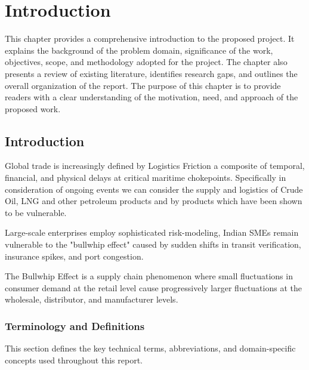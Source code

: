 \chapter{Introduction}
This chapter provides a comprehensive introduction to the proposed project. It explains the
background of the problem domain, significance of the work, objectives, scope, and
methodology adopted for the project. The chapter also presents a review of existing literature,
identifies research gaps, and outlines the overall organization of the report. The purpose of
this chapter is to provide readers with a clear understanding of the motivation, need, and
approach of the proposed work.

\section[Introduction]{\textbf{Introduction}}
Global trade is increasingly defined by Logistics Friction a composite of temporal, financial, and physical delays at critical maritime chokepoints. Specifically in consideration of ongoing events we can consider the supply and logistics of Crude Oil, LNG and other petroleum products and by products which have been shown to be vulnerable. 

Large-scale enterprises employ sophisticated risk-modeling, Indian SMEs remain vulnerable to the "bullwhip effect" caused by sudden shifts in transit verification, insurance spikes, and port congestion. 

The Bullwhip Effect is a supply chain phenomenon where small fluctuations in consumer demand at the retail level cause progressively larger fluctuations at the wholesale, distributor, and manufacturer levels.


\subsection[Terminology and Definitions]{\textbf{Terminology and Definitions}}

This section defines the key technical terms, abbreviations, and domain-specific concepts used throughout this report.


